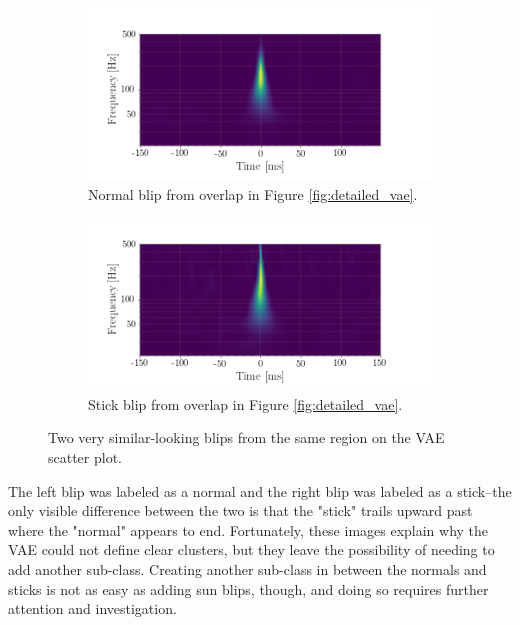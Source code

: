 \documentclass[a4paper]{article}
\begin{document}
\begin{figure}[h!]
	\centering
	\begin{subfigure}{.49\textwidth}
		\centering
		\includegraphics[width=1\linewidth]{normalish}
		\caption{Normal blip from overlap in Figure \ref{fig:detailed_vae}.}
		\label{fig:normalish}
	\end{subfigure}
	\begin{subfigure}{.49\textwidth}
		\centering
		\includegraphics[width=1\linewidth]{stickish}
		\caption{Stick blip from overlap in Figure \ref{fig:detailed_vae}.}
		\label{fig:stickish}
	\end{subfigure}
	\caption{Two very similar-looking blips from the same region on the VAE scatter plot.}
	\label{fig:overlap}
\end{figure}

The left blip was labeled as a normal and the right blip was labeled as a stick--the only visible difference between the two is that the "stick" trails upward past where the "normal" appears to end. Fortunately, these images explain why the VAE could not define clear clusters, but they leave the possibility of needing to add another sub-class. Creating another sub-class in between the normals and sticks is not as easy as adding sun blips, though, and doing so requires further attention and investigation.
\end{document}
